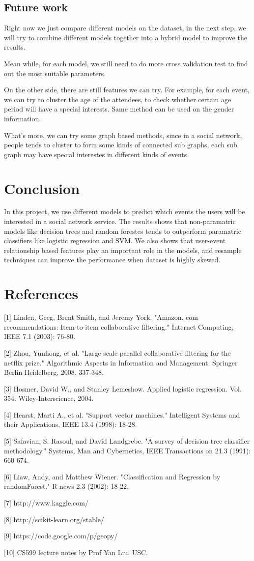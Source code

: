 \documentclass{article} %
\begin{document}
\subsection{Future work}
Right now we just compare different models on the dataset, in the next step, we will try to combine different models together into a hybrid model to improve the results. 

Mean while, for each model, we still need to do more cross validation test to find out the most suitable parameters.

On the other side, there are still features we can try. For example, for each event, we can try to cluster the age of the attendees, to check whether certain age period will have a special interests. Same method can be used on the gender information. 

What's more, we can try some graph based methods, since in a social network, people tends to cluster to form some kinds of connected sub graphs, each sub graph may have special interestes in different kinds of events.

\section{Conclusion}

In this project, we use different models to predict which events the users will be interested in a social network service. The results shows that non-paramatric models like decision trees and random forestes tends to outperform paramatric classifiers like logistic regression and SVM. We also shows that user-event relationship based features play an important role in the models, and resample techniques can improve the performance when dataset is highly skewed.

\section{References}
[1] Linden, Greg, Brent Smith, and Jeremy York. "Amazon. com recommendations: Item-to-item collaborative filtering." Internet Computing, IEEE 7.1 (2003): 76-80.

[2] Zhou, Yunhong, et al. "Large-scale parallel collaborative filtering for the netflix prize." Algorithmic Aspects in Information and Management. Springer Berlin Heidelberg, 2008. 337-348.

[3] Hosmer, David W., and Stanley Lemeshow. Applied logistic regression. Vol. 354. Wiley-Interscience, 2004.

[4] Hearst, Marti A., et al. "Support vector machines." Intelligent Systems and their Applications, IEEE 13.4 (1998): 18-28.

[5] Safavian, S. Rasoul, and David Landgrebe. "A survey of decision tree classifier methodology." Systems, Man and Cybernetics, IEEE Transactions on 21.3 (1991): 660-674.

[6] Liaw, Andy, and Matthew Wiener. "Classification and Regression by randomForest." R news 2.3 (2002): 18-22.

[7] http://www.kaggle.com/

[8] http://scikit-learn.org/stable/

[9] https://code.google.com/p/geopy/ 

[10] CS599 lecture notes by Prof Yan Liu, USC.
\end{document}
